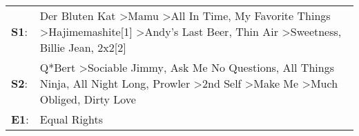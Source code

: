 \begin{supertabular}{p{0.03\textwidth}p{0.92\textwidth}}
 \textbf{S1}:  &  Der Bluten Kat\textsuperscript{} \textgreater \enspace Mamu\textsuperscript{} \textgreater \enspace All In Time\textsuperscript{}, \enspace My Favorite Things\textsuperscript{} \textgreater \enspace Hajimemashite[1]\textsuperscript{} \textgreater \enspace Andy's Last Beer\textsuperscript{}, \enspace Thin Air\textsuperscript{} \textgreater \enspace Sweetness\textsuperscript{}, \enspace Billie Jean\textsuperscript{}, \enspace 2x2[2]\textsuperscript{}  \enspace  \\
 \textbf{S2}:  &              Q*Bert\textsuperscript{} \textgreater \enspace Sociable Jimmy\textsuperscript{}, \enspace Ask Me No Questions\textsuperscript{}, \enspace All Things Ninja\textsuperscript{}, \enspace All Night Long\textsuperscript{}, \enspace Prowler\textsuperscript{} \textgreater \enspace 2nd Self\textsuperscript{} \textgreater \enspace Make Me\textsuperscript{} \textgreater \enspace Much Obliged\textsuperscript{}, \enspace Dirty Love\textsuperscript{}  \enspace  \\
 \textbf{E1}:  &                                                                                                                                                                                                                                                                                                                                                                                                                                        Equal Rights\textsuperscript{}  \enspace  \\
\end{supertabular}
